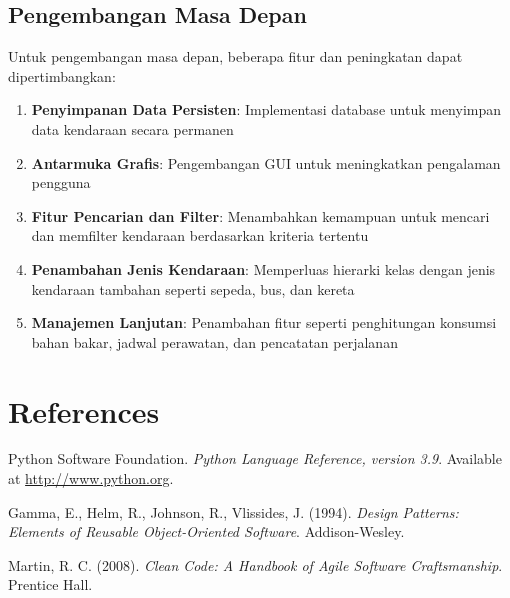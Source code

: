 \documentclass[12pt]{article}
\begin{document}
\subsection{Pengembangan Masa Depan}
Untuk pengembangan masa depan, beberapa fitur dan peningkatan dapat dipertimbangkan:
\begin{enumerate}
    \item \textbf{Penyimpanan Data Persisten}: Implementasi database untuk menyimpan data kendaraan secara permanen
    \item \textbf{Antarmuka Grafis}: Pengembangan GUI untuk meningkatkan pengalaman pengguna
    \item \textbf{Fitur Pencarian dan Filter}: Menambahkan kemampuan untuk mencari dan memfilter kendaraan berdasarkan kriteria tertentu
    \item \textbf{Penambahan Jenis Kendaraan}: Memperluas hierarki kelas dengan jenis kendaraan tambahan seperti sepeda, bus, dan kereta
    \item \textbf{Manajemen Lanjutan}: Penambahan fitur seperti penghitungan konsumsi bahan bakar, jadwal perawatan, dan pencatatan perjalanan
\end{enumerate}

\section{References}
\begin{thebibliography}{9}
 Python Software Foundation. \textit{Python Language Reference, version 3.9}. Available at \url{http://www.python.org}.

 Gamma, E., Helm, R., Johnson, R., Vlissides, J. (1994). \textit{Design Patterns: Elements of Reusable Object-Oriented Software}. Addison-Wesley.

 Martin, R. C. (2008). \textit{Clean Code: A Handbook of Agile Software Craftsmanship}. Prentice Hall.
\end{thebibliography}
\end{document}

